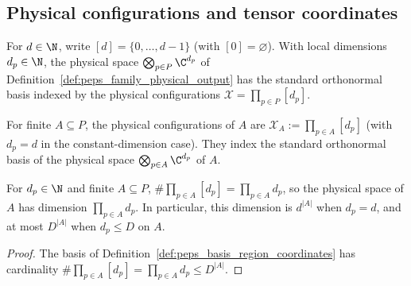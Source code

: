 
\subsection{Physical configurations and tensor coordinates}

For $d\in\N$, write $[d]=\{0,\ldots,d-1\}$ (with $[0]=\varnothing$). With local dimensions $d_p\in\N$, the physical space $\bigotimes_{p\in P}\C^{d_p}$ of Definition~\ref{def:peps_family_physical_output} has the standard orthonormal basis indexed by the physical configurations $\mathcal X=\prod_{p\in P}[d_p]$.

\begin{definition}
    \label{def:peps_basis_region_coordinates}
    \leanok
    For finite $A\subseteq P$, the physical configurations of $A$ are $\mathcal X_A:=\prod_{p\in A}[d_p]$ (with $d_p=d$ in the constant-dimension case). They index the standard orthonormal basis of the physical space $\bigotimes_{p\in A}\C^{d_p}$ of $A$.
\end{definition}

\begin{lemma}
    \label{thm:peps_basis_physical_dimensions}
    \leanok
    For $d_p\in\N$ and finite $A\subseteq P$, $\#\prod_{p\in A}[d_p]=\prod_{p\in A}d_p$, so the physical space of $A$ has dimension $\prod_{p\in A}d_p$.
    In particular, this dimension is $d^{|A|}$ when $d_p=d$, and at most $D^{|A|}$ when $d_p\le D$ on $A$.
\end{lemma}

\begin{proof}
    \leanok
    The basis of Definition~\ref{def:peps_basis_region_coordinates} has cardinality $\#\prod_{p\in A}[d_p]=\prod_{p\in A}d_p\le D^{|A|}$.
\end{proof}

